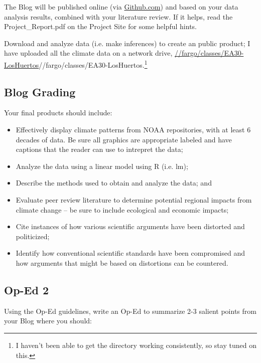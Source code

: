 \documentclass{article}\usepackage[]{graphicx}\usepackage[]{color}
\newenvironment{enumerate*}%
  {\begin{enumerate}%
    \setlength{\itemsep}{0pt}%
    \setlength{\parskip}{0pt}}%
  {\end{enumerate}}
\begin{document}
The Blog will be published online (via \url{Github.com}) and based on your data analysis results, combined with your literature review. If it helps, read the Project\_Report.pdf on the Project Site for some helpful hints.

\begin{enumerate*}

  \item Download and analyze data (i.e. make inferences) to create an public product; I have uploaded all the climate data on a network drive, \url{//fargo/classes/EA30-LosHuertos}{//fargo/classes/EA30-LosHuertos}.\footnote{I haven't been able to get the directory working consistently, so stay tuned on this.}
  
\end{enumerate*}

\subsection{Blog Grading}

Your final products should include:

\begin{itemize}
  \item Effectively display climate patterns from NOAA repositories, with at least 6 decades of data. Be sure all graphics are appropriate labeled and have captions that the reader can use to intrepret the data;
  \item Analyze the data using a linear model using R (i.e. lm);
  \item Describe the methods used to obtain and analyze the data; and
  \item Evaluate peer review literature to determine potential regional impacts from climate change -- be sure to include ecological and economic impacts; 
  \item Cite instances of how various scientific arguments have been distorted and politicized;
  \item Identify how conventional scientific standards have been compromised and how arguments that might be based on distortions can be countered.
\end{itemize}

\subsection{Op-Ed 2}

Using the Op-Ed guidelines, write an Op-Ed to summarize 2-3 salient points from your Blog where you should:
\end{document}
